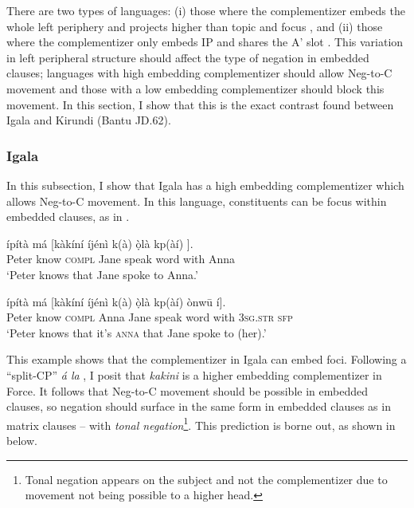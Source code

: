 \documentclass[output=paper,colorlinks,citecolor=brown,
]{langscibook}
\begin{document}
There are two types of languages: (i) those where the complementizer embeds the whole left periphery and projects higher than topic and focus \citep[as \textit{e.g.}, Wolof and Italian;][]{dunigan1994clausal, rizzi1997fine}, and (ii) those where the complementizer only embeds IP and shares the A' slot \citep[as \textit{e.g.}, German and Old English;][]{gelderen2004cp}. This variation in left peripheral structure should affect the type of negation in embedded clauses; languages with high embedding complementizer should allow Neg-to-C movement and those with a low embedding complementizer should block this movement. In this section, I show that this is the exact contrast found between Igala and Kirundi (Bantu JD.62).

\subsubsection{Igala}

In this subsection, I show that Igala has a high embedding complementizer which allows Neg-to-C movement. In this language, constituents can be focus within embedded clauses, as in .

\ea \label{igalaembfoc}%
\begin{xlist}
    \ex\gll \'{i}p\'{i}t\`{a} m\'{a} [k\`{a}k\'{i}n\'{i} \'{i}j\'{e}n\`{i} k(\`{a}) \`{ọ}l\`{a} kp(\`{a}\'{i}) ].\\
    Peter know \textsc{compl} Jane speak word with Anna\\
    \glt `Peter knows that Jane spoke to Anna.' 
    
    \ex\gll \'{i}p\'{i}t\`{a} m\'{a} [k\`{a}k\'{i}n\'{i}  \'{i}j\'{e}n\`{i} k(\`{a}) \`{ọ}l\`{a} kp(\`{a}\'{i}) \`{o}nwū \'{i}].\\
    Peter know \textsc{compl} Anna Jane speak word with \textsc{3sg.str} \textsc{sfp}\\
    \glt `Peter knows that it's \textsc{anna} that Jane spoke to (her).'    
\end{xlist}
\z

This example shows that the complementizer in Igala can embed foci. Following a ``split-CP'' \textit{\'{a} la} \citet{rizzi1997fine}, I posit that \textit{kakini} is a higher embedding complementizer in Force. It follows that Neg-to-C movement should be possible in embedded clauses, so negation should surface in the same form in embedded clauses as in matrix clauses -- with \textit{tonal negation}\footnote{Tonal negation appears on the subject and not the complementizer due to movement not being possible to a higher head.}. This prediction is borne out, as shown in  below.
\end{document}
